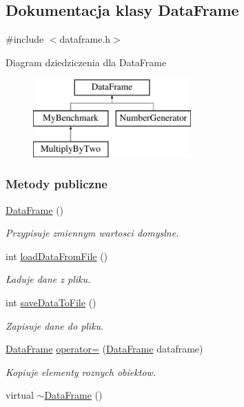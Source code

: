 \hypertarget{class_data_frame}{\subsection{Dokumentacja klasy Data\-Frame}
\label{class_data_frame}
}


{\ttfamily \#include $<$dataframe.\-h$>$}

Diagram dziedziczenia dla Data\-Frame\begin{figure}[H]
\begin{center}
\leavevmode
\includegraphics[height=3.000000cm]{class_data_frame}
\end{center}
\end{figure}
\subsubsection*{Metody publiczne}
\begin{DoxyCompactItemize}
\item 
\hyperlink{class_data_frame_a69a9dc47b7506b8062fd34aedacbf579}{Data\-Frame} ()
\begin{DoxyCompactList}\small\item\em Przypisuje zmiennym wartosci domyslne. \end{DoxyCompactList}\item 
int \hyperlink{class_data_frame_a617ef21804065f31115c01527155f499}{load\-Data\-From\-File} ()
\begin{DoxyCompactList}\small\item\em Ładuje dane z pliku. \end{DoxyCompactList}\item 
int \hyperlink{class_data_frame_a03cc3ac606fdb8a2dbcaea5d429cf208}{save\-Data\-To\-File} ()
\begin{DoxyCompactList}\small\item\em Zapisuje dane do pliku. \end{DoxyCompactList}\item 
\hyperlink{class_data_frame}{Data\-Frame} \hyperlink{class_data_frame_ab7dddb09f5ee9dc4a5783136dad01962}{operator=} (\hyperlink{class_data_frame}{Data\-Frame} dataframe)
\begin{DoxyCompactList}\small\item\em Kopiuje elementy roznych obiektow. \end{DoxyCompactList}\item 
virtual \hyperlink{class_data_frame_a1360ddf00d717392fe1292bc1e1990ff}{$\sim$\-Data\-Frame} ()
\end{DoxyCompactItemize}
